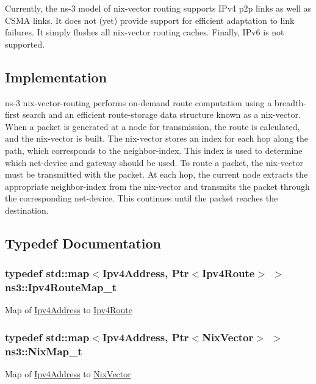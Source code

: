 Currently, the ns-\/3 model of nix-\/vector routing supports I\+Pv4 p2p links as well as C\+S\+MA links. It does not (yet) provide support for efficient adaptation to link failures. It simply flushes all nix-\/vector routing caches. Finally, I\+Pv6 is not supported.\hypertarget{group__nix-vector-routing_impl}{}\subsection{Implementation}\label{group__nix-vector-routing_impl}
ns-\/3 nix-\/vector-\/routing performs on-\/demand route computation using a breadth-\/first search and an efficient route-\/storage data structure known as a nix-\/vector. When a packet is generated at a node for transmission, the route is calculated, and the nix-\/vector is built. The nix-\/vector stores an index for each hop along the path, which corresponds to the neighbor-\/index. This index is used to determine which net-\/device and gateway should be used. To route a packet, the nix-\/vector must be transmitted with the packet. At each hop, the current node extracts the appropriate neighbor-\/index from the nix-\/vector and transmits the packet through the corresponding net-\/device. This continues until the packet reaches the destination. 

\subsection{Typedef Documentation}
\subsubsection[{\texorpdfstring{Ipv4\+Route\+Map\+\_\+t}{Ipv4RouteMap_t}}]{\setlength{\rightskip}{0pt plus 5cm}typedef std\+::map$<$Ipv4\+Address, Ptr$<$Ipv4\+Route$>$ $>$ {\bf ns3\+::\+Ipv4\+Route\+Map\+\_\+t}}\hypertarget{group__nix-vector-routing_ga0a2084e70cce2de3dcfab5da0ec63bdd}{}\label{group__nix-vector-routing_ga0a2084e70cce2de3dcfab5da0ec63bdd}
Map of \hyperlink{classns3_1_1Ipv4Address}{Ipv4\+Address} to \hyperlink{classns3_1_1Ipv4Route}{Ipv4\+Route} 
\subsubsection[{\texorpdfstring{Nix\+Map\+\_\+t}{NixMap_t}}]{\setlength{\rightskip}{0pt plus 5cm}typedef std\+::map$<$Ipv4\+Address, Ptr$<$Nix\+Vector$>$ $>$ {\bf ns3\+::\+Nix\+Map\+\_\+t}}\hypertarget{group__nix-vector-routing_gaa552b6157fc91cb632b9007a4cef9bc7}{}\label{group__nix-vector-routing_gaa552b6157fc91cb632b9007a4cef9bc7}
Map of \hyperlink{classns3_1_1Ipv4Address}{Ipv4\+Address} to \hyperlink{classns3_1_1NixVector}{Nix\+Vector} 